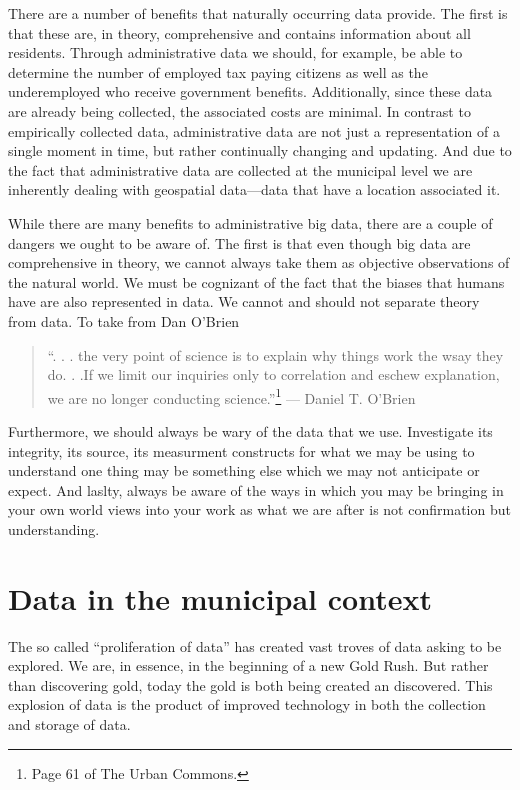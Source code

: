 \documentclass[
]{book}
\begin{document}
There are a number of benefits that naturally occurring data provide. The first is that these are, in theory, comprehensive and contains information about all residents. Through administrative data we should, for example, be able to determine the number of employed tax paying citizens as well as the underemployed who receive government benefits. Additionally, since these data are already being collected, the associated costs are minimal. In contrast to empirically collected data, administrative data are not just a representation of a single moment in time, but rather continually changing and updating. And due to the fact that administrative data are collected at the municipal level we are inherently dealing with geospatial data---data that have a location associated it.

While there are many benefits to administrative big data, there are a couple of dangers we ought to be aware of. The first is that even though big data are comprehensive in theory, we cannot always take them as objective observations of the natural world. We must be cognizant of the fact that the biases that humans have are also represented in data. We cannot and should not separate theory from data. To take from Dan O'Brien

\begin{quote}
``. . . the very point of science is to explain why things work the wsay they do. . .If we limit our inquiries only to correlation and eschew explanation, we are no longer conducting science.''\footnote{Page 61 of The Urban Commons.}
--- Daniel T. O'Brien
\end{quote}

Furthermore, we should always be wary of the data that we use. Investigate its integrity, its source, its measurment constructs for what we may be using to understand one thing may be something else which we may not anticipate or expect. And laslty, always be aware of the ways in which you may be bringing in your own world views into your work as what we are after is not confirmation but understanding.

\hypertarget{data-in-the-municipal-context}{%
\chapter{Data in the municipal context}\label{data-in-the-municipal-context}}

The so called ``proliferation of data'' has created vast troves of data asking to be explored. We are, in essence, in the beginning of a new Gold Rush. But rather than discovering gold, today the gold is both being created an discovered. This explosion of data is the product of improved technology in both the collection and storage of data.
\end{document}
